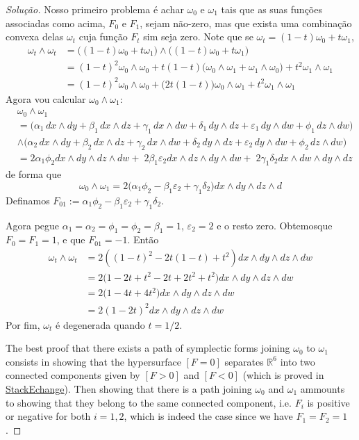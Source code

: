 \begin{proof}[Solução]
	Nosso primeiro problema é achar $\omega_0$ e $\omega_1$ tais que as suas funções associadas como acima, $F_0$ e $F_1$, sejam não-zero, mas que exista uma combinação convexa delas $\omega_t$ cuja função $F_t$ sim seja zero. Note que se $\omega_t=(1-t)\omega_0+t\omega_1$,
\begin{align*}
	\omega_t\wedge \omega_t&=\Big( (1-t)\omega_0+t\omega_1 \Big) \wedge \Big( (1-t)\omega_0+t \omega_1 \Big) \\
	&=(1-t)^2\omega_0\wedge \omega_0 +t(1-t)\Big(\omega_0\wedge \omega_1+\omega_1\wedge \omega_0\Big)+t^2\omega_1\wedge \omega_1\\
	&=(1-t)^2\omega_0\wedge \omega_0+\Big(2t(1-t)\Big)\omega_0\wedge \omega_1+t^2\omega_1\wedge \omega_1
\end{align*}
Agora vou calcular $\omega_0\wedge \omega_1$:
\begin{align*}
	&\omega_0\wedge \omega_1\\
	&=\Big( \alpha_1 \, dx \wedge dy + \beta_1 \, dx \wedge dz + \gamma_1 \, dx \wedge dw + \delta_1 \, dy \wedge dz + \varepsilon_1 \, dy \wedge dw + \phi_1 \, dz \wedge dw \Big)\\
	&\wedge \Big( \alpha_2 \, dx \wedge dy + \beta_2 \, dx \wedge dz + \gamma_2 \, dx \wedge dw + \delta_2 \, dy \wedge dz + \varepsilon_2 \, dy \wedge dw + \phi_2 \, dz \wedge dw \Big) \\
	&= 2\alpha_1 \phi_2dx\wedge dy\wedge dz\wedge dw+\;2\beta_1\varepsilon_2 dx\wedge dz\wedge dy\wedge dw+\; 2\gamma_1\delta_2dx\wedge dw \wedge dy\wedge dz
\end{align*}
de forma que
\[\omega_0\wedge \omega_1=2\Big(\alpha_1\phi_2-\beta_1 \varepsilon_2+\gamma_1 \delta_2\Big)dx\wedge dy\wedge dz\wedge d\]
Definamos $F_{01}:=\alpha_1\phi_2-\beta_1 \varepsilon_2+\gamma_1 \delta_2$.

Agora pegue $\alpha_1=\alpha_2=\phi_1=\phi_2=\beta_1=1$, $\varepsilon_2=2$ e o resto zero. Obtemosque $F_0=F_1=1$, e que $F_{01}=-1$. Então
\begin{align*}
\omega_t\wedge \omega_t&=2\left( (1-t)^2-2t(1-t)+t^2 \right)  dx\wedge dy\wedge dz\wedge dw\\
&=2\Big( 1-2t+t^2-2t+2t^2+t^2 \Big)dx\wedge dy\wedge dz\wedge dw\\
&=2\Big( 1-4t+4t^2 \Big)dx\wedge dy\wedge dz\wedge dw\\
&=2(1-2t)^2dx\wedge dy\wedge dz\wedge dw
\end{align*}
Por fim, $\omega_t$ é degenerada quando $t=1/2$.

{\color{2}The best proof that there exists a path of symplectic forms joining $\omega_0$ to $\omega_1$ consists in showing that the hypersurface $[F=0]$ separates $\mathbb{R}^{6}$ into two connected components given by $[F>0]$ and  $[F<0]$ (which is proved in \href{https://math.stackexchange.com/questions/2864834/non-linear-path-between-symplectic-forms-in-mathbbr4}{StackEchange}). Then showing that there is a path joining  $\omega_0$ and $\omega_1$ ammounts to showing that they belong to the same connected component, i.e. $F_i$ is positive or negative for both $i=1,2$, which is indeed the case since we have $F_1=F_2=1$.}


\end{proof}
